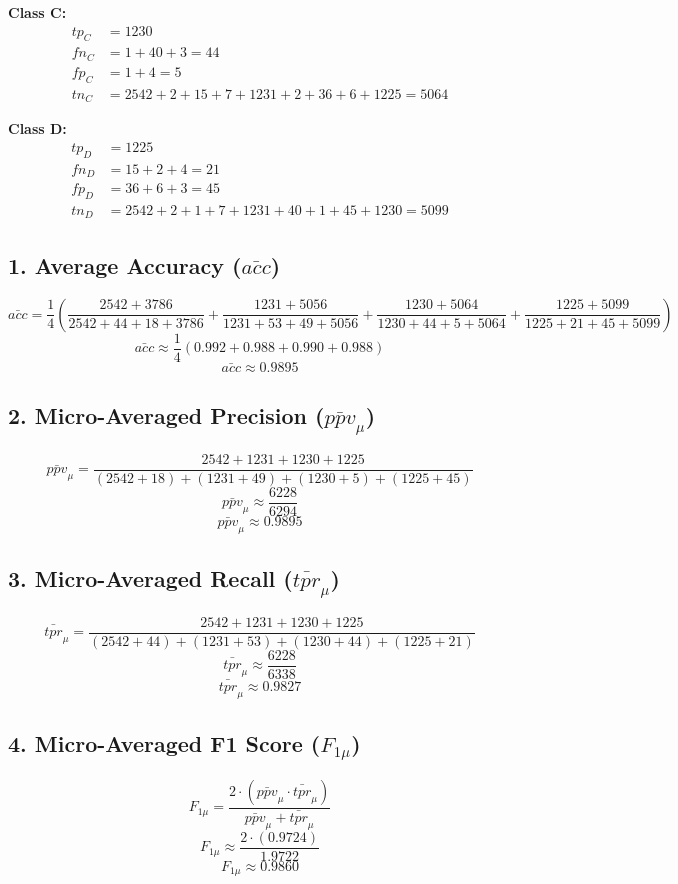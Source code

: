 \documentclass{article}
\begin{document}
\textbf{Class C:}
\begin{align*}
tp_C &= 1230 \\
fn_C &= 1 + 40 + 3 = 44 \\
fp_C &= 1 + 4 = 5 \\
tn_C &= 2542 + 2 + 15 + 7 + 1231 + 2 + 36 + 6 + 1225 = 5064
\end{align*}

\textbf{Class D:}
\begin{align*}
tp_D &= 1225 \\
fn_D &= 15 + 2 + 4 = 21 \\
fp_D &= 36 + 6 + 3 = 45 \\
tn_D &= 2542 + 2 + 1 + 7 + 1231 + 40 + 1 + 45 + 1230 = 5099
\end{align*}

\subsection*{1. Average Accuracy (\( \bar{acc} \))}
\[
\bar{acc} = \frac{1}{4} \left( \frac{2542 + 3786}{2542 + 44 + 18 + 3786} + \frac{1231 + 5056}{1231 + 53 + 49 + 5056} + \frac{1230 + 5064}{1230 + 44 + 5 + 5064} + \frac{1225 + 5099}{1225 + 21 + 45 + 5099} \right)
\]
\[ \bar{acc} \approx \frac{1}{4} \left( 0.992 + 0.988 + 0.990 + 0.988 \right) \]
\[ \bar{acc} \approx 0.9895 \]


\subsection*{2. Micro-Averaged Precision (\( \bar{ppv}_\mu \))}
\[
\bar{ppv}_\mu = \frac{2542 + 1231 + 1230 + 1225}{(2542 + 18) + (1231 + 49) + (1230 + 5) + (1225 + 45)}
\]
\[ \bar{ppv}_\mu \approx \frac{6228}{6294} \]
\[ \bar{ppv}_\mu \approx 0.9895 \]


\subsection*{3. Micro-Averaged Recall (\( \bar{tpr}_\mu \))}
\[
\bar{tpr}_\mu = \frac{2542 + 1231 + 1230 + 1225}{(2542 + 44) + (1231 + 53) + (1230 + 44) + (1225 + 21)}
\]
\[ \bar{tpr}_\mu \approx \frac{6228}{6338} \]
\[ \bar{tpr}_\mu \approx 0.9827 \]


\subsection*{4. Micro-Averaged F1 Score (\( F_{1\mu} \))}
\[
F_{1\mu} = \frac{2 \cdot (\bar{ppv}_\mu \cdot \bar{tpr}_\mu)}{\bar{ppv}_\mu + \bar{tpr}_\mu}
\]
\[ F_{1\mu} \approx \frac{2 \cdot (0.9724)}{1.9722} \]
\[ F_{1\mu} \approx 0.9860 \]
\end{document}
